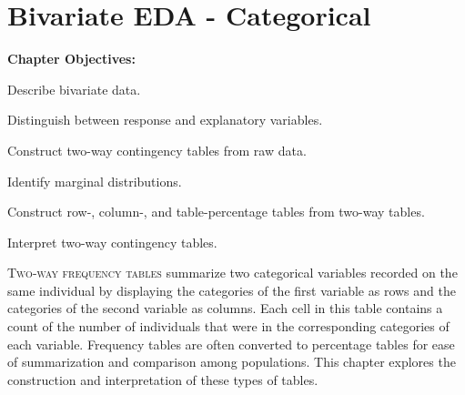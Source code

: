 \documentclass[10pt,openany]{book}\usepackage[]{graphicx}\usepackage[]{color}
\begin{document}
\chapter{Bivariate EDA - Categorical} \label{chap:BivEDACat}
\begin{ChapObj}{\boxwidth}
  \textbf{Chapter Objectives:}
  \begin{Enumerate}
    \item Describe bivariate data.
    \item Distinguish between response and explanatory variables.
    \item Construct two-way contingency tables from raw data.
    \item Identify marginal distributions.
    \item Construct row-, column-, and table-percentage tables from two-way tables.
    \item Interpret two-way contingency tables.
  \end{Enumerate}
\end{ChapObj}

\minitoc
\vspace{48pt}

\lettrine{T}{wo-way frequency tables} summarize two categorical variables recorded on the same individual by displaying the categories of the first variable as rows and the categories of the second variable as columns.  Each cell in this table contains a count of the number of individuals that were in the corresponding categories of each variable.  Frequency tables are often converted to percentage tables for ease of summarization and comparison among populations.  This chapter explores the construction and interpretation of these types of tables.
\end{document}
